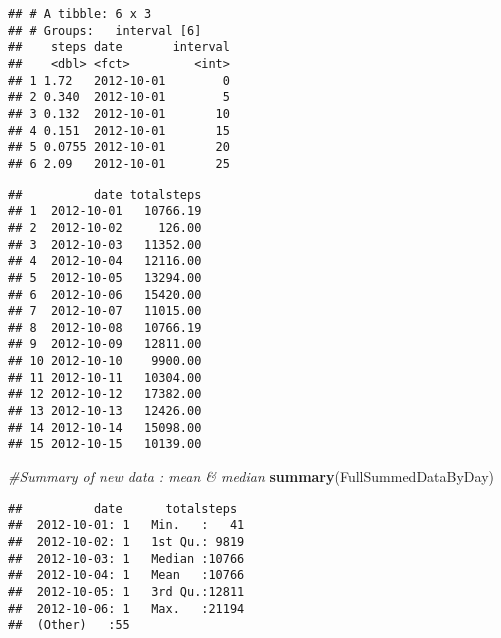 \documentclass[
]{article}
\newenvironment{Shaded}{\begin{snugshade}}{\end{snugshade}}
\newcommand{\CommentTok}[1]{\textcolor[rgb]{0.56,0.35,0.01}{\textit{#1}}}
\newcommand{\DataTypeTok}[1]{\textcolor[rgb]{0.13,0.29,0.53}{#1}}
\newcommand{\DecValTok}[1]{\textcolor[rgb]{0.00,0.00,0.81}{#1}}
\newcommand{\KeywordTok}[1]{\textcolor[rgb]{0.13,0.29,0.53}{\textbf{#1}}}
\newcommand{\NormalTok}[1]{#1}
\newcommand{\OperatorTok}[1]{\textcolor[rgb]{0.81,0.36,0.00}{\textbf{#1}}}
\newcommand{\StringTok}[1]{\textcolor[rgb]{0.31,0.60,0.02}{#1}}
\begin{document}
\begin{verbatim}
## # A tibble: 6 x 3
## # Groups:   interval [6]
##    steps date       interval
##    <dbl> <fct>         <int>
## 1 1.72   2012-10-01        0
## 2 0.340  2012-10-01        5
## 3 0.132  2012-10-01       10
## 4 0.151  2012-10-01       15
## 5 0.0755 2012-10-01       20
## 6 2.09   2012-10-01       25
\end{verbatim}

\begin{Shaded}
\end{Shaded}

\begin{verbatim}
##          date totalsteps
## 1  2012-10-01   10766.19
## 2  2012-10-02     126.00
## 3  2012-10-03   11352.00
## 4  2012-10-04   12116.00
## 5  2012-10-05   13294.00
## 6  2012-10-06   15420.00
## 7  2012-10-07   11015.00
## 8  2012-10-08   10766.19
## 9  2012-10-09   12811.00
## 10 2012-10-10    9900.00
## 11 2012-10-11   10304.00
## 12 2012-10-12   17382.00
## 13 2012-10-13   12426.00
## 14 2012-10-14   15098.00
## 15 2012-10-15   10139.00
\end{verbatim}

\begin{Shaded}
\begin{Highlighting}[]
\CommentTok{#Summary of new data : mean & median}
\KeywordTok{summary}\NormalTok{(FullSummedDataByDay)}
\end{Highlighting}
\end{Shaded}

\begin{verbatim}
##          date      totalsteps   
##  2012-10-01: 1   Min.   :   41  
##  2012-10-02: 1   1st Qu.: 9819  
##  2012-10-03: 1   Median :10766  
##  2012-10-04: 1   Mean   :10766  
##  2012-10-05: 1   3rd Qu.:12811  
##  2012-10-06: 1   Max.   :21194  
##  (Other)   :55
\end{verbatim}
\end{document}
